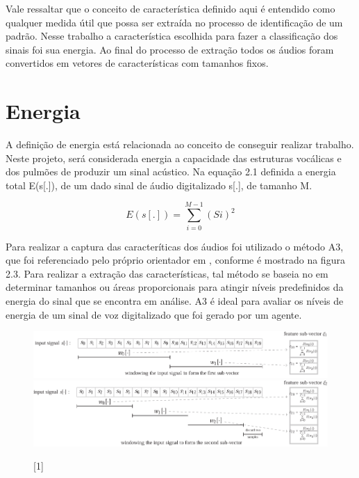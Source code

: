 \documentclass[a4paper,12pt,twoside,openright]{report}
\begin{document}
\par Vale ressaltar que o conceito de caracter\'{i}stica definido aqui \'{e} entendido como qualquer medida \'{u}til que possa ser extra\'{i}da no processo de identifica{\c c}\~{a}o de um padr\~{a}o. Nesse trabalho a caracter\'{i}stica escolhida para fazer a classifica{\c c}\~{a}o dos sinais foi sua energia. Ao final do processo de extra{\c c}\~{a}o todos os \'{a}udios foram convertidos em vetores de caracter\'{i}sticas com tamanhos fixos.

\section{Energia}
\label{energia}
\par A defini{\c c}\~{a}o de energia est\'{a} relacionada ao conceito de conseguir realizar trabalho. Neste projeto, ser\'{a} considerada energia a capacidade das estruturas voc\'{a}licas e dos pulm\~{o}es de produzir um sinal ac\'{u}stico. Na equa{\c c}\~{a}o 2.1 definida a energia total E(s[.]), de um dado sinal de \'{a}udio digitalizado s[.], de tamanho M.

\begin{equation}
	E(s[.])=\sum_{i = 0}^{M-1} (Si)^2
\end{equation}

\par Para realizar a captura das caracter\'{i}ticas dos \'{a}udios foi utilizado o m\'{e}todo A3, que foi referenciado pelo pr\'{o}prio orientador em \cite{Guido_tutorial}, conforme \'{e} mostrado na figura 2.3. Para realizar a extra{\c c}\~{a}o das caracter\'{i}sticas, tal m\'{e}todo se baseia no em determinar tamanhos ou \'{a}reas proporcionais para atingir n\'{i}veis predefinidos da energia do sinal que se encontra em an\'{a}lise. A3 \'{e} ideal para avaliar os n\'{i}veis de energia de um sinal de voz digitalizado que foi gerado por um agente.

\begin{figure}[h]
	\caption{[1]}
	
	\centering %
	\includegraphics[width=18cm]{figuras/vetor_caracteristicas1.png}
	\includegraphics[width=18cm]{figuras/vetor_caracteristicas2.png}
	\label{figura:energia_vetor}
\end{figure}
\end{document}

